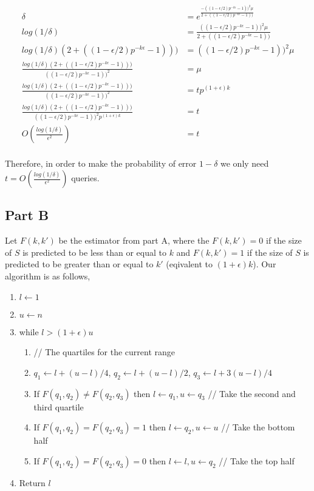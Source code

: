 \documentclass[a4paper]{article}
\def \eps{\epsilon}
\begin{document}
\begin{align*}
	\delta &= e^{\frac{-((1-\eps/2)p^{-k\eps} - 1))^2 \mu}{2 + ((1-\eps/2)p^{-k\eps} - 1))}} \\
	log(1/\delta) &= \frac{((1-\eps/2)p^{-k\eps} - 1))^2 \mu}{2 + ((1-\eps/2)p^{-k\eps} - 1))}\\
	log(1/\delta)(2 + ((1-\eps/2)p^{-k\eps} - 1))) &= ((1-\eps/2)p^{-k\eps} - 1))^2 \mu\\
	\frac{log(1/\delta)(2 + ((1-\eps/2)p^{-k\eps} - 1)))}{((1-\eps/2)p^{-k\eps} - 1))^2} &=  \mu\\
	\frac{log(1/\delta)(2 + ((1-\eps/2)p^{-k\eps} - 1)))}{((1-\eps/2)p^{-k\eps} - 1))^2} &=  tp^{(1+\eps)k}\\
	\frac{log(1/\delta)(2 + ((1-\eps/2)p^{-k\eps} - 1)))}{((1-\eps/2)p^{-k\eps} - 1))^2 p^{(1+\eps)k}} &=  t\\
	O(\frac{log(1/\delta)}{\eps^2}) &= t\\
\end{align*}

Therefore, in order to make the probability of error $1-\delta$ we only need $t = O(\frac{log(1/\delta)}{\eps^2})$
queries.


\subsection{Part B}

Let $F(k, k')$ be the estimator from part A, where the $F(k, k') = 0$ if the size of $S$ is predicted to 
be less than or equal to $k$ and  $F(k, k') = 1$ if the size of $S$ is predicted to be greater than 
or equal to $k'$ (eqivalent to $(1+\eps)k$). Our algorithm is as follows,

\begin{enumerate}
	\item $l \gets 1$
	\item $u \gets n$
	\item while $l > (1+\eps)u$
	\begin{enumerate}
		\item // The quartiles for the current range
		\item $q_1 \gets  l + (u - l) / 4$, $q_2 \gets  l + (u - l) / 2$, $q_3 \gets  l + 3(u - l) / 4$
		\item If $F(q_1, q_2) \neq F(q_2, q_3)$ then $l \gets q_1, u \gets q_3$ // Take the second and third quartile
		\item If $F(q_1, q_2) = F(q_2, q_3) = 1$ then $l \gets q_2, u \gets u$ // Take the bottom half
		\item If $F(q_1, q_2) = F(q_2, q_3) = 0$ then $l \gets l, u \gets q_2$ // Take the top half
	\end{enumerate}
	\item Return $l$
\end{enumerate}
\end{document}
